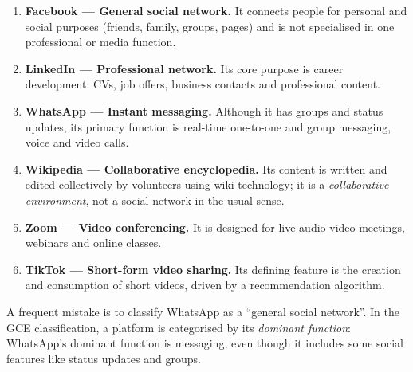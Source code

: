 \documentclass[11pt]{article}
\begin{document}
\begin{corrige}
\begin{enumerate}
    \item \textbf{Facebook — General social network.} It connects people for personal and social purposes (friends, family, groups, pages) and is not specialised in one professional or media function.
    \item \textbf{LinkedIn — Professional network.} Its core purpose is career development: CVs, job offers, business contacts and professional content.
    \item \textbf{WhatsApp — Instant messaging.} Although it has groups and status updates, its primary function is real-time one-to-one and group messaging, voice and video calls.
    \item \textbf{Wikipedia — Collaborative encyclopedia.} Its content is written and edited collectively by volunteers using wiki technology; it is a \emph{collaborative environment}, not a social network in the usual sense.
    \item \textbf{Zoom — Video conferencing.} It is designed for live audio-video meetings, webinars and online classes.
    \item \textbf{TikTok — Short-form video sharing.} Its defining feature is the creation and consumption of short videos, driven by a recommendation algorithm.
\end{enumerate}
\begin{attention}
A frequent mistake is to classify WhatsApp as a ``general social network''. In the GCE classification, a platform is categorised by its \emph{dominant function}: WhatsApp's dominant function is messaging, even though it includes some social features like status updates and groups.
\end{attention}
\end{corrige}
\end{document}
